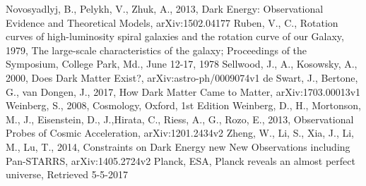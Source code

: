 \documentclass[a4paper,12pt]{article}
\begin{document}
\begin{thebibliography}{1}
Novosyadlyj, B., Pelykh, V., Zhuk, A., 2013, Dark Energy: Observational Evidence and Theoretical Models, arXiv:1502.04177
Ruben, V., C., Rotation curves of high-luminosity spiral galaxies and the rotation curve of our Galaxy, 1979, The large-scale characteristics of the galaxy; Proceedings of the Symposium, College Park, Md., June 12-17, 1978
Sellwood, J., A., Kosowsky, A., 2000, Does Dark Matter Exist?, arXiv:astro-ph/0009074v1
de Swart, J., Bertone, G., van Dongen, J., 2017, How Dark Matter Came to Matter, arXiv:1703.00013v1
Weinberg, S., 2008, Cosmology, Oxford, 1st Edition
Weinberg, D., H., Mortonson, M., J., Eisenstein, D., J.,Hirata, C., Riess, A., G., Rozo, E., 2013, Observational Probes of Cosmic Acceleration, arXiv:1201.2434v2
Zheng, W., Li, S., Xia, J., Li, M., Lu, T., 2014, Constraints on Dark Energy new New Observations including Pan-STARRS, arXiv:1405.2724v2
Planck, ESA, Planck reveals an almost perfect universe, Retrieved 5-5-2017
\end{thebibliography}
\end{document}

